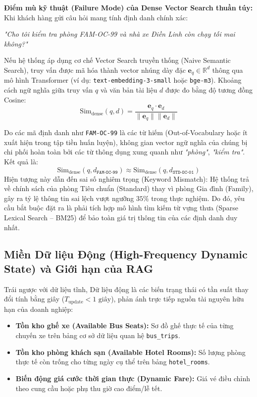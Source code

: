 \textbf{Điểm mù kỹ thuật (Failure Mode) của Dense Vector Search thuần túy:} \\
Khi khách hàng gửi câu hỏi mang tính định danh chính xác:
\begin{center}
\textit{"Cho tôi kiểm tra phòng FAM-OC-99 và nhà xe Điền Linh còn chạy tối mai không?"}
\end{center}
Nếu hệ thống áp dụng cơ chế Vector Search truyền thống (Naive Semantic Search), truy vấn được mã hóa thành vector nhúng dày đặc $\mathbf{e}_q \in \mathbb{R}^d$ thông qua mô hình Transformer (ví dụ: \texttt{text-embedding-3-small} hoặc \texttt{bge-m3}). Khoảng cách ngữ nghĩa giữa truy vấn $q$ và văn bản tài liệu $d$ được đo bằng độ tương đồng Cosine:
\begin{equation}
\text{Sim}_{\text{dense}}(q, d) = \frac{\mathbf{e}_q \cdot \mathbf{e}_d}{\|\mathbf{e}_q\| \|\mathbf{e}_d\|}
\end{equation}

Do các mã định danh như \texttt{FAM-OC-99} là các từ hiếm (Out-of-Vocabulary hoặc ít xuất hiện trong tập tiền huấn luyện), không gian vector ngữ nghĩa của chúng bị chi phối hoàn toàn bởi các từ thông dụng xung quanh như \textit{"phòng"}, \textit{"kiểm tra"}. Kết quả là:
\begin{equation}
\text{Sim}_{\text{dense}}(q, d_{\texttt{FAM-OC-99}}) \approx \text{Sim}_{\text{dense}}(q, d_{\texttt{STD-OC-01}})
\end{equation}
Hiện tượng này dẫn đến sai số nghiêm trọng (Keyword Mismatch): Hệ thống trả về chính sách của phòng Tiêu chuẩn (Standard) thay vì phòng Gia đình (Family), gây ra tỷ lệ thông tin sai lệch vượt ngưỡng $35\%$ trong thực nghiệm. Do đó, yêu cầu bắt buộc đặt ra là phải tích hợp mô hình tìm kiếm từ vựng thưa (Sparse Lexical Search -- BM25) để bảo toàn giá trị thông tin của các định danh duy nhất.

\subsection{Miền Dữ liệu Động (High-Frequency Dynamic State) và Giới hạn của RAG}
\label{subsec:dynamic_data}

Trái ngược với dữ liệu tĩnh, Dữ liệu động là các biến trạng thái có tần suất thay đổi tính bằng giây ($T_{\text{update}} < 1\text{ giây}$), phản ánh trực tiếp nguồn tài nguyên hữu hạn của doanh nghiệp:
\begin{itemize}
    \item \textbf{Tồn kho ghế xe (Available Bus Seats):} Sơ đồ ghế thực tế của từng chuyến xe trên bảng cơ sở dữ liệu quan hệ \texttt{bus\_trips}.
    \item \textbf{Tồn kho phòng khách sạn (Available Hotel Rooms):} Số lượng phòng thực tế còn trống cho từng ngày cụ thể trên bảng \texttt{hotel\_rooms}.
    \item \textbf{Biến động giá cước thời gian thực (Dynamic Fare):} Giá vé điều chỉnh theo cung cầu hoặc phụ thu giờ cao điểm/lễ tết.
\end{itemize}

